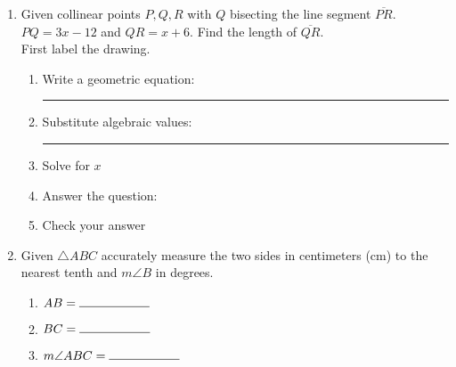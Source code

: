 \documentclass[12pt, twoside]{article}
\begin{document}
\begin{enumerate}
\item Given collinear points $P, Q, R$ with $Q$ bisecting the line segment $\overline{PR}$. $PQ=3x -12$ and $QR = x+6$. Find the length of $\overline{QR}$.\\First label the drawing.
  \begin{flushright}
  \end{flushright}
  \begin{enumerate}
    \item Write a geometric equation: \rule{4cm}{0.15mm} \vspace{.7cm}
    \item Substitute algebraic values: \rule{4cm}{0.15mm}
    \item Solve for $x$
    \vspace{2.5cm}
    \item Answer the question: \bigskip
    \item Check your answer
  \end{enumerate}

\newpage
\item Given $\triangle ABC$ accurately measure the two sides in centimeters (cm) to the nearest tenth and $m \angle B$ in degrees.
    \bigskip
  \begin{enumerate}
    \item $AB= \rule{2cm}{0.15mm}$ \bigskip
    \item $BC= \rule{2cm}{0.15mm}$ \bigskip
    \item $m \angle ABC= \rule{2cm}{0.15mm}$
  \end{enumerate}
  \begin{center}
  \end{center}



\end{enumerate}
\end{document}
